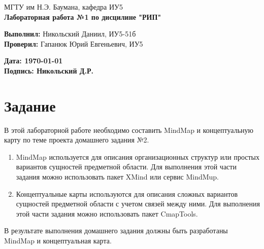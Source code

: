 \documentclass{article}
\begin{document}
\begin{titlepage}
    \begin{center}
        \normalsize
        МГТУ им Н.Э. Баумана, кафедра ИУ5 \\
        \vspace*{1cm}
        \LARGE
        \textbf{Лабораторная работа №1 по дисцилине "РИП"}

        \vspace{0.5cm}
    \end{center}
    \vfill

    \begin{flushright}
        \textbf{Выполнил:} Никольский Даниил, ИУ5-51б \\
        \textbf{Проверил:} Гапанюк Юрий Евгеньевич, ИУ5 \\
    \end{flushright}
    \vspace{1.5cm}
    \begin{flushleft}
        \textbf{Дата: \today} \\
        \textbf{Подпись: Никольский Д.Р.} \\
    \end{flushleft}
\end{titlepage}

\tableofcontents
\newpage
\section{Задание}
В этой лабораторной работе необходимо составить MindMap и концептуальную карту по теме проекта домашнего задания №2.
\begin{enumerate}
    \item MindMap используется для описания организационных структур или простых вариантов сущностей предметной области. Для выполнения этой части задания можно использовать пакет XMind или сервис MindMup.

    \item Концептуальные карты используются для описания сложных вариантов сущностей предметной области с учетом связей между ними. Для выполнения этой части задания можно использовать пакет CmapTools.

\end{enumerate}
В результате выполнения домашнего задания должны быть разработаны MindMap и концептуальная карта.
\end{document}
